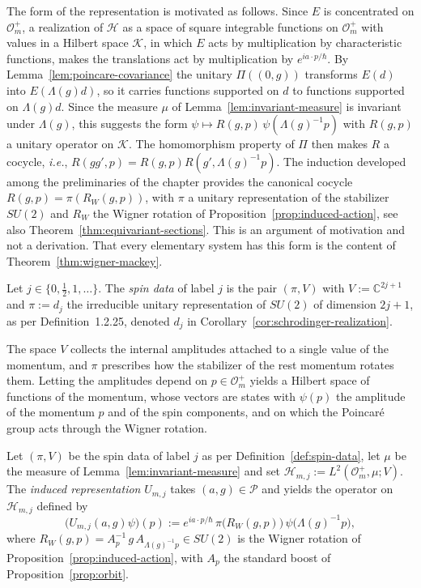 The form of the representation is motivated as follows. Since $E$ is concentrated on $\mathcal{O}_m^+$, a realization of $\mathcal{H}$ as a space of square integrable functions on $\mathcal{O}_m^+$ with values in a Hilbert space $\mathcal{K}$, in which $E$ acts by multiplication by characteristic functions, makes the translations act by multiplication by $e^{ia\cdot p/\hbar}$. By Lemma~\ref{lem:poincare-covariance} the unitary $\Pi((0,g))$ transforms $E(d)$ into $E(\Lambda(g)d)$, so it carries functions supported on $d$ to functions supported on $\Lambda(g)d$. Since the measure $\mu$ of Lemma~\ref{lem:invariant-measure} is invariant under $\Lambda(g)$, this suggests the form $\psi\mapsto R(g,p)\,\psi(\Lambda(g)^{-1}p)$ with $R(g,p)$ a unitary operator on $\mathcal{K}$. The homomorphism property of $\Pi$ then makes $R$ a cocycle, \textit{i.e.}, $R(gg',p)=R(g,p)R(g',\Lambda(g)^{-1}p)$. The induction developed among the preliminaries of the chapter provides the canonical cocycle $R(g,p)=\pi(R_W(g,p))$, with $\pi$ a unitary representation of the stabilizer $SU(2)$ and $R_W$ the Wigner rotation of Proposition~\ref{prop:induced-action}, see also Theorem~\ref{thm:equivariant-sections}. This is an argument of motivation and not a derivation. That every elementary system has this form is the content of Theorem~\ref{thm:wigner-mackey}.

\begin{definition}\label{def:spin-data}
	Let $j\in\{0,\tfrac12,1,\dots\}$. The \emph{spin data} of label $j$ is the pair $(\pi,V)$ with $V:=\mathbb{C}^{2j+1}$ and $\pi:=d_j$ the irreducible unitary representation of $SU(2)$ of dimension $2j+1$, as per Definition~1.2.25, denoted $d_j$ in Corollary~\ref{cor:schrodinger-realization}.
\end{definition}

The space $V$ collects the internal amplitudes attached to a single value of the momentum, and $\pi$ prescribes how the stabilizer of the rest momentum rotates them. Letting the amplitudes depend on $p\in\mathcal{O}_m^+$ yields a Hilbert space of functions of the momentum, whose vectors are states with $\psi(p)$ the amplitude of the momentum $p$ and of the spin components, and on which the Poincar\'e group acts through the Wigner rotation.

\begin{definition}\label{def:induced-rep}
	Let $(\pi,V)$ be the spin data of label $j$ as per Definition~\ref{def:spin-data}, let $\mu$ be the measure of Lemma~\ref{lem:invariant-measure} and set $\mathcal{H}_{m,j}:=L^2(\mathcal{O}_m^+,\mu;V)$. The \emph{induced representation} $U_{m,j}$ takes $(a,g)\in\mathcal{P}$ and yields the operator on $\mathcal{H}_{m,j}$ defined by
	\begin{equation}\label{eq:induced-rep}
		\big(U_{m,j}(a,g)\psi\big)(p):=e^{ia\cdot p/\hbar}\,\pi\big(R_W(g,p)\big)\,\psi\big(\Lambda(g)^{-1}p\big),
	\end{equation}
	where $R_W(g,p)=A_p^{-1}\,g\,A_{\Lambda(g)^{-1}p}\in SU(2)$ is the Wigner rotation of Proposition~\ref{prop:induced-action}, with $A_p$ the standard boost of Proposition~\ref{prop:orbit}.
\end{definition}

